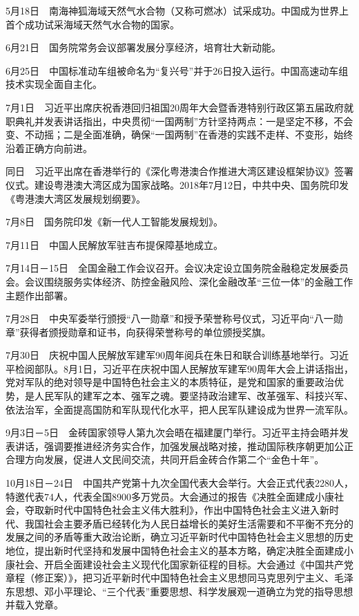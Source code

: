 \documentclass[10pt,a4paper,twocolumn]{book}
\begin{document}
5月18日　南海神狐海域天然气水合物（又称可燃冰）试采成功。中国成为世界上首个成功试采海域天然气水合物的国家。

6月21日　国务院常务会议部署发展分享经济，培育壮大新动能。

6月25日　中国标准动车组被命名为“复兴号”并于26日投入运行。中国高速动车组技术实现全面自主化。

7月1日　习近平出席庆祝香港回归祖国20周年大会暨香港特别行政区第五届政府就职典礼并发表讲话指出，中央贯彻“一国两制”方针坚持两点：一是坚定不移，不会变、不动摇；二是全面准确，确保“一国两制”在香港的实践不走样、不变形，始终沿着正确方向前进。

同日　习近平出席在香港举行的《深化粤港澳合作推进大湾区建设框架协议》签署仪式。建设粤港澳大湾区成为国家战略。2018年7月12日，中共中央、国务院印发《粤港澳大湾区发展规划纲要》。

7月8日　国务院印发《新一代人工智能发展规划》。

7月11日　中国人民解放军驻吉布提保障基地成立。

7月14日－15日　全国金融工作会议召开。会议决定设立国务院金融稳定发展委员会。会议围绕服务实体经济、防控金融风险、深化金融改革“三位一体”的金融工作主题作出部署。

7月28日　中央军委举行颁授“八一勋章”和授予荣誉称号仪式，习近平向“八一勋章”获得者颁授勋章和证书，向获得荣誉称号的单位颁授奖旗。

7月30日　庆祝中国人民解放军建军90周年阅兵在朱日和联合训练基地举行。习近平检阅部队。8月1日，习近平在庆祝中国人民解放军建军90周年大会上讲话指出，党对军队的绝对领导是中国特色社会主义的本质特征，是党和国家的重要政治优势，是人民军队的建军之本、强军之魂。要坚持政治建军、改革强军、科技兴军、依法治军，全面提高国防和军队现代化水平，把人民军队建设成为世界一流军队。

9月3日－5日　金砖国家领导人第九次会晤在福建厦门举行。习近平主持会晤并发表讲话，强调要推进经济务实合作，加强发展战略对接，推动国际秩序朝更加公正合理方向发展，促进人文民间交流，共同开启金砖合作第二个“金色十年”。

10月18日－24日　中国共产党第十九次全国代表大会举行。大会正式代表2280人，特邀代表74人，代表全国8900多万党员。大会通过的报告《决胜全面建成小康社会，夺取新时代中国特色社会主义伟大胜利》，作出中国特色社会主义进入新时代、我国社会主要矛盾已经转化为人民日益增长的美好生活需要和不平衡不充分的发展之间的矛盾等重大政治论断，确立习近平新时代中国特色社会主义思想的历史地位，提出新时代坚持和发展中国特色社会主义的基本方略，确定决胜全面建成小康社会、开启全面建设社会主义现代化国家新征程的目标。大会通过《中国共产党章程（修正案）》，把习近平新时代中国特色社会主义思想同马克思列宁主义、毛泽东思想、邓小平理论、“三个代表”重要思想、科学发展观一道确立为党的指导思想并载入党章。
\end{document}
